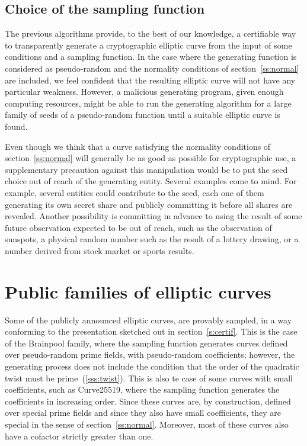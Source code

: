 \documentclass[twocolumn,letterpaper]{article}
\begin{document}
\subsection{Choice of the sampling function}

The previous algorithms provide, to the best of our knowledge,
a certifiable way to transparently generate a cryptographic elliptic curve
from the input of some conditions and a sampling function.
In the case where the generating function is considered as pseudo-random
and the normality conditions of section~\ref{ss:normal} are included,
we feel confident that the resulting elliptic curve
will not have any particular weakness.
However, a malicious generating program, given enough computing resources,
might be able to run the generating algorithm
for a large family of seeds of a pseudo-random function
until a suitable elliptic curve is found.

Even though we think that a curve satisfying the normality conditions
of section~\ref{ss:normal} will generally be as good as possible
for cryptographic use,
a supplementary precaution against this manipulation
would be to put the seed choice out of reach of the generating entity.
Several examples come to mind.
For example, several entities could contribute to the seed,
each one of them generating its own secret share
and publicly committing it before all shares are revealed.
Another possibility is committing in advance to using
the result of some future observation expected to be out of reach,
such as the observation of sunspots,
a physical random number such as the result of a lottery drawing,
or a number derived from stock market or sports results.


\section{Public families of elliptic curves}

Some of the publicly announced elliptic curves,
are provably sampled, in a way conforming to the presentation
sketched out in section~\ref{s:certif}.
This is the case of the Brainpool family,
where the sampling function generates
curves defined over pseudo-random prime fields,
with pseudo-random coefficients;
however, the generating process does not include
the condition that the order of the quadratic twist must be
prime~(\ref{sss:twist}).
This is also te case of some curves with small coefficients,
such as Curve25519,
where the sampling function generates the coefficients
in increasing order.
Since these curves are, by construction,
defined over special prime fields
and since they also have small coefficients,
they are special in the sense of section~\ref{ss:normal}.
Moreover, most of these curves
also have a cofactor strictly greater than one.
\end{document}

